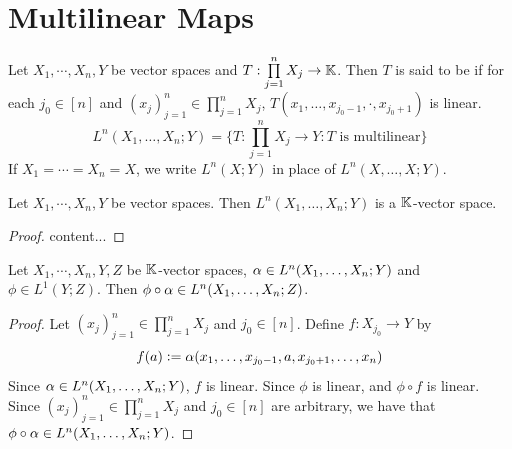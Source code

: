 \documentclass{book}
\begin{document}
 
 
 
 
 
 
 
 
 
 
 
 
 
 
 
 
 
 
 
 
 
 
 
 
 
 
 
 
 
 
 
 
 
 
 \newpage
 \section{Multilinear Maps}
 
 \begin{defn}
 	Let $X_1, \cdots, X_n, Y$ be vector spaces and $T: \prod\limits_{j=1}^n X_j \rightarrow \mathbb{K}$. Then $T$ is said to be  if for each $j_0 \in [n]$ and $(x_j)_{j=1}^n \in \prod\limits_{j=1}^n X_j$, $T(x_1, \ldots, x_{j_0 - 1}, \cdot, x_{j_0 + 1})$ is linear. $$L^n(X_1, \dots, X_n; Y) = \bigg\{T : \prod\limits_{j=1}^n X_j \rightarrow Y: T \text{ is multilinear}\bigg \}$$ 
 	If $X_1 = \cdots = X_n = X$, we write $L^n(X;Y)$ in place of $L^n (X, \dots, X; Y) $. 
 \end{defn}
 
 \begin{defn}
 \end{defn}
 
 \begin{ex}
 	Let $X_1, \cdots, X_n, Y$ be vector spaces. Then $L^n(X_1, \ldots, X_n;Y)$ is a $\mathbb{K}$-vector space.
 \end{ex}
 
 \begin{proof}
 	content...
 \end{proof}
 
 \begin{ex}
 	Let $X_1, \cdots, X_n, Y, Z$ be $\mathbb{K}$-vector spaces, $\alpha \in L^n(X_1, \ldots, X_n;Y)$ and $\phi \in L^1(Y;Z)$. Then $\phi \circ \alpha \in L^n(X_1, \ldots, X_n; Z)$. 
 \end{ex}
 
 \begin{proof}
 	Let $(x_j)_{j=1}^n \in \prod\limits_{j=1}^n X_j$ and $j_0 \in [n]$. Define $f:X_{j_0} \rightarrow Y$ by 
 	$$f(a) \vcentcolon= \alpha(x_1, \ldots, x_{j_0-1}, a , x_{j_0+1}, \ldots, x_n) $$
 	Since $\alpha \in L^n(X_1, \ldots, X_n;Y)$, $f$ is linear. Since $\phi$ is linear, and $\phi \circ f$ is linear. Since $(x_j)_{j=1}^n \in \prod\limits_{j=1}^n X_j$ and $j_0 \in [n]$ are arbitrary, we have that $\phi \circ \alpha \in L^n(X_1, \ldots, X_n;Y)$. 
 \end{proof}
 
\end{document}
